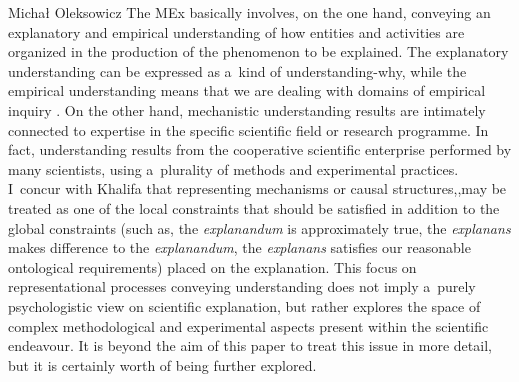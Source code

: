 \begin{artengenv}{Michał Oleksowicz}
The MEx basically involves, on the one hand, conveying an explanatory and empirical understanding of how entities and activities are organized in the production of the phenomenon to be explained. The explanatory understanding can be expressed as a~kind of understanding-why, while the empirical understanding means that we are dealing with domains of empirical inquiry
\parencite[][pp.1–3]{khalifa_understanding_2017}. %
 On the other hand, mechanistic understanding results are intimately connected to expertise in the specific scientific field or research programme. In fact, understanding results from the cooperative scientific enterprise performed by many scientists, using a~plurality of methods and experimental practices. I~concur with Khalifa that representing mechanisms or causal structures,,may be treated as one of the local constraints that should be satisfied in addition to the global constraints (such as, the \textit{explanandum} is approximately true, the \textit{explanans} makes difference to the \textit{explanandum}, the \textit{explanans} satisfies our reasonable ontological requirements) placed on the explanation. This focus on representational processes conveying understanding does not imply a~purely psychologistic view on scientific explanation, but rather explores the space of complex methodological and experimental aspects present within the scientific endeavour. It is beyond the aim of this paper to treat this issue in more detail, but it is certainly worth of being further explored.


\end{artengenv}
